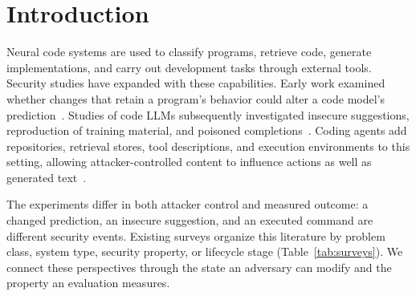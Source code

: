 \documentclass[acmsmall,screen,review,nonacm]{acmart}
\begin{document}

\maketitle

\section{Introduction}
\label{sec:intro}
\label{sec:related}

Neural code systems are used to classify programs, retrieve code, generate implementations, and carry out development tasks through external tools. Security studies have expanded with these capabilities. Early work examined whether changes that retain a program's behavior could alter a code model's prediction~\cite{yefet2020adversarial,zhang2020generating}. Studies of code LLMs subsequently investigated insecure suggestions, reproduction of training material, and poisoned completions~\cite{pearce2022asleep,ziegler2021recitation,schuster2021autocomplete}. Coding agents add repositories, retrieval stores, tool descriptions, and execution environments to this setting, allowing attacker-controlled content to influence actions as well as generated text~\cite{liu2025yourai,xie2025redteaming}.

The experiments differ in both attacker control and measured outcome: a changed prediction, an insecure suggestion, and an executed command are different security events. Existing surveys organize this literature by problem class, system type, security property, or lifecycle stage (Table~\ref{tab:surveys}). We connect these perspectives through the state an adversary can modify and the property an evaluation measures.
\end{document}
